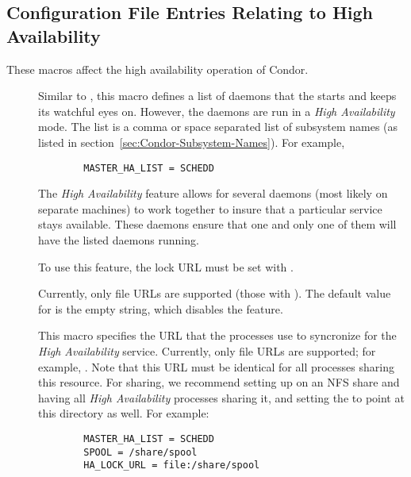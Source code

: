 \subsection{\label{sec:HA-Config-File-Entries}Configuration File Entries
Relating to High Availability}

These macros affect the high availability operation of Condor.

\begin{description}
\item[] \label{param:MasterHAList} Similar to
  , this macro defines a list of daemons that
  the  starts and keeps its watchful eyes on.
  However, the  daemons are run in a
  \emph{High Availability} mode.
  The list is a comma or space separated list of subsystem names
  (as listed in section~\ref{sec:Condor-Subsystem-Names}).
  For example,
  \begin{verbatim}
        MASTER_HA_LIST = SCHEDD
  \end{verbatim}

  The \emph{High Availability} feature allows for several 
  daemons (most likely on separate machines) to work together to
  insure that a particular service stays available.  These
   daemons ensure that one and only one of them will
  have the listed daemons running.

  To use this feature, the lock URL must be set with
  .

  Currently, only file URLs are supported 
  (those with ).
  The default value for  is 
  the empty string, which disables the feature.
  
\item[] \label{param:HALockURL} This macro
  specifies the URL that the  processes use to
  syncronize for the \emph{High Availability} service.
  Currently, only file URLs are supported; for example,
  .  Note that this URL must be identical
  for all  processes sharing this resource.  For
   sharing, we recommend setting up 
  on an NFS share and having all \emph{High Availability}
   processes sharing it,
  and setting the  to point at this directory
  as well.  For example:
\begin{verbatim}
        MASTER_HA_LIST = SCHEDD
        SPOOL = /share/spool
        HA_LOCK_URL = file:/share/spool
\end{verbatim}


\end{description}
